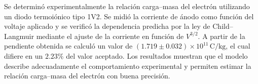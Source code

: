 Se determinó experimentalmente la relación carga--masa del electrón utilizando un
diodo termoiónico tipo 1V2. Se midió la corriente de ánodo como función del voltaje
aplicado y se verificó la dependencia predicha por la ley de Child--Langmuir mediante
el ajuste de la corriente en función de $V^{3/2}$. A partir de la pendiente obtenida
se calculó un valor de
$\left(1.719\pm0.032\right)\times10^{11}\,\mathrm{C/kg}$,
el cual difiere en un $2.23\%$ del valor aceptado. Los resultados muestran que el
modelo describe adecuadamente el comportamiento experimental y permiten estimar la
relación carga--masa del electrón con buena precisión.
